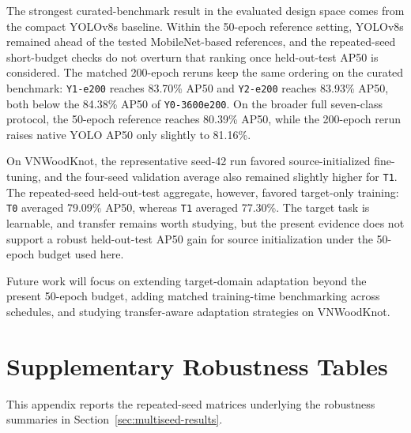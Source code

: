 \documentclass[10pt,a4paper]{article}
\begin{document}
The strongest curated-benchmark result in the evaluated design space comes from the compact YOLOv8s baseline. Within the 50-epoch reference setting, YOLOv8s remained ahead of the tested MobileNet-based references, and the repeated-seed short-budget checks do not overturn that ranking once held-out-test AP50 is considered. The matched 200-epoch reruns keep the same ordering on the curated benchmark: \texttt{Y1-e200} reaches 83.70\% AP50 and \texttt{Y2-e200} reaches 83.93\% AP50, both below the 84.38\% AP50 of \texttt{Y0-3600e200}. On the broader full seven-class protocol, the 50-epoch reference reaches 80.39\% AP50, while the 200-epoch rerun raises native YOLO AP50 only slightly to 81.16\%.

On VNWoodKnot, the representative seed-42 run favored source-initialized fine-tuning, and the four-seed validation average also remained slightly higher for \texttt{T1}. The repeated-seed held-out-test aggregate, however, favored target-only training: \texttt{T0} averaged 79.09\% AP50, whereas \texttt{T1} averaged 77.30\%. The target task is learnable, and transfer remains worth studying, but the present evidence does not support a robust held-out-test AP50 gain for source initialization under the 50-epoch budget used here.

Future work will focus on extending target-domain adaptation beyond the present 50-epoch budget, adding matched training-time benchmarking across schedules, and studying transfer-aware adaptation strategies on VNWoodKnot.

\appendix
\section{Supplementary Robustness Tables}
\label{sec:appendix-robustness}

This appendix reports the repeated-seed matrices underlying the robustness summaries in Section~\ref{sec:multiseed-results}.
\end{document}
